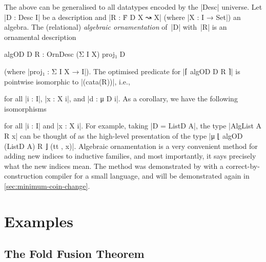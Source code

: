 The above can be generalised to all datatypes encoded by the |Desc| universe.
Let |D : Desc I| be a description and |R : Ḟ D X ↝ X| (where |X : I → Set|) an algebra.
The (relational) \emph{algebraic ornamentation} of~|D| with~|R| is an ornamental description
\begin{code}
algOD D R : OrnDesc (Σ I X) proj₁ D
\end{code}
(where |proj₁ : Σ I X → I|).
The optimised predicate for |⌈ algOD D R ⌉| is pointwise isomorphic to |(cata(R))|, i.e.,
for all |i : I|, |x : X i|, and |d : μ D i|.
As a corollary, we have the following isomorphisms
for all |i : I| and |x : X i|.
For example, taking |D = ListD A|, the type |AlgList A R x| can be thought of as the high-level presentation of the type |μ ⌊ algOD (ListD A) R ⌋ (tt , x)|.
Algebraic ornamentation is a very convenient method for adding new indices to inductive families, and most importantly, it says precisely what the new indices mean.
The method was demonstrated by \citet{McBride-ornaments} with a correct-by-construction compiler for a small language, and will be demonstrated again in \autoref{sec:minimum-coin-change}.

\section{Examples}

\subsection{The Fold Fusion Theorem}


